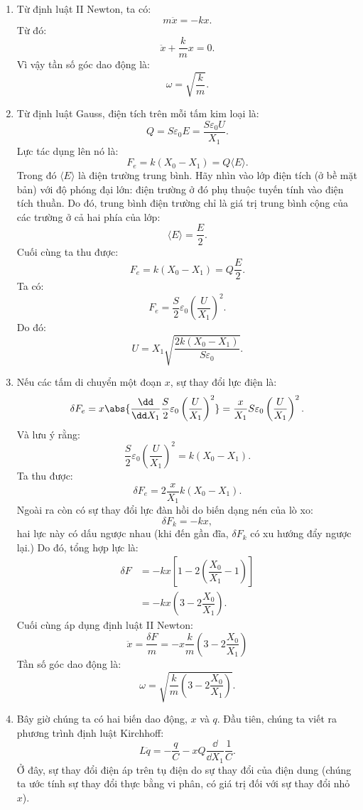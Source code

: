 \begin{loigiai}
\begin{enumerate}[1)]
    \item Từ định luật II Newton, ta có:
    \[m \ddot x=-kx.\]
    Từ đó:
    \[\ddot x +\dfrac{k}{m}x=0.\]
    Vì vậy tần số góc dao động là:
    \[\omega =\sqrt{\dfrac{k}{m}}.\]
    \item Từ định luật Gauss, điện tích trên mỗi tấm kim loại là:
    \[
Q=S \varepsilon_{0} E=\dfrac{S \varepsilon_0 U}{X_1}.
\]
Lực tác dụng lên nó là:
\[
F_{e}=k\left(X_{0}-X_{1}\right)=Q\langle E\rangle.
\]
Trong đó $\langle E\rangle$ là điện trường trung bình. Hãy nhìn vào lớp điện tích (ở bề mặt bản) với độ phóng đại lớn: điện trường ở đó phụ thuộc tuyến tính vào điện tích thuần. Do đó, trung bình điện trường chỉ là giá trị trung bình cộng của các trường ở cả hai phía của lớp:
\[\langle E\rangle=\dfrac{E}{2}.\]
Cuối cùng ta thu được:
\[F_{e}=k\left(X_{0}-X_{1}\right)=Q\dfrac{E}{2}.\]
Ta có:
\[F_{e}=\dfrac{S}{2} \varepsilon_{0}\left(\dfrac{U}{X_{1}}\right)^{2}.  \]
Do đó:
\[ U=X_{1} \sqrt{ \dfrac{2 k\left(X_{0}-X_{1}\right)}{S \varepsilon_{0}}}.\]
\item Nếu các tấm di chuyển một đoạn $x$, sự thay đổi lực điện là:
\[
\delta F_{e}=x \abs{\dfrac{\dd}{\dd X_{1}} \dfrac{S}{2} \varepsilon_{0}\left(\dfrac{U}{X_{1}} \right)^{2} }= \dfrac{x}{X_{1}} S \varepsilon_{0}\left(\dfrac{U}{X_1}  \right)^{2}.
\]
Và lưu ý rằng:
\[
\dfrac{S}{2} \varepsilon_{0}\left(\dfrac{U}{X_1}\right)^{2}=k\left(X_{0}-X_{1}\right).
\]
Ta thu được:
\[\delta F_{e}=2 \dfrac{x}{X_{1}} k\left(X_{0}-X_{1}\right).\]
Ngoài ra còn có sự thay đổi lực đàn hồi do biến dạng nén của lò xo:
\[\delta F_k=-kx,\]
hai lực này có dấu ngược nhau (khi đến gần đĩa, $\delta F_k$ có xu hướng đẩy ngược lại.) Do đó, tổng hợp lực là:
\begin{align*}
\delta F&=-kx \left[1-2\left(\dfrac{X_0}{X_1}-1\right)\right]\\
&=-kx\left(3-2\dfrac{X_0}{X_1}\right).
\end{align*}
Cuối cùng áp dụng định luật II Newton:
\[\ddot{x}=\dfrac{\delta F}{m}=-x \dfrac{k}{m}\left(3-2 \dfrac{X_{0}}{X_{1}}\right)\]
Tần số góc dao động là:
\[
\omega=\sqrt{\frac{k}{m}\left(3-2 \frac{X_{0}}{X_{1}}\right)}.
\]
\item Bây giờ chúng ta có hai biến dao động, $x$ và $q$. Đầu tiên, chúng ta viết ra
phương trình định luật Kirchhoff:
\[L \ddot{q}=-\dfrac{q}{C}-x Q \dfrac{\dd}{\dd X_{1} }\dfrac{1}{C} .\]
Ở đây, sự thay đổi điện áp trên tụ điện do sự thay đổi của điện dung (chúng ta ước tính sự thay đổi thực bằng vi phân, có giá trị đối với sự thay đổi nhỏ $x$).\\

\end{enumerate}
\end{loigiai}
